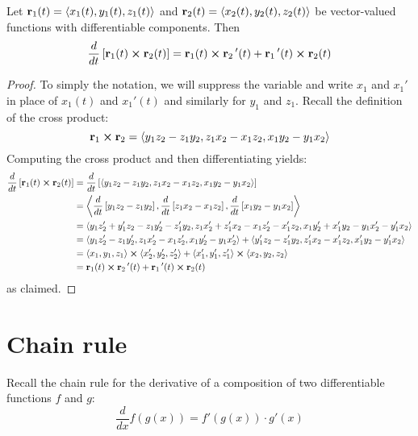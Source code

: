 \documentclass[handout]{ximera}
\begin{document}
\begin{proposition}
Let $\mathbf r_1(t) = \left\langle x_1(t), y_1(t),z_1(t)\right\rangle$ and $\mathbf r_2(t) = \left\langle x_2(t), y_2(t),z_2(t)\right\rangle$ be vector-valued functions with differentiable components.
Then
\[
\frac{d}{dt}\left[\mathbf r_1(t) \boldsymbol\times \mathbf r_2(t)\right] = \mathbf r_1(t) \boldsymbol\times \mathbf r_2\,'(t) + \mathbf r_1\,'(t) \boldsymbol\times \mathbf r_2(t)
\]
\end{proposition}
\begin{proof}
To simply the notation, we will suppress the variable and write $x_1$ and $x_1'$ in place of $x_1(t)$ and $x_1'(t)$ and similarly for $y_1$ and $z_1$.
Recall the definition of the cross product:
\[
\mathbf{r}_1 \boldsymbol\times \mathbf{r}_2 =  \left\langle y_1z_2 - z_1y_2, z_1x_2 - x_1z_2, x_1y_2 - y_1x_2\right\rangle
\]
Computing the cross product and then differentiating yields:
\begin{align*}
\frac{d}{dt}\left[\mathbf r_1(t) \boldsymbol\times \mathbf r_2(t)\right] &= \frac{d}{dt} \left[ \left\langle y_1z_2 - z_1y_2, z_1x_2 - x_1z_2, x_1y_2 - y_1x_2\right\rangle\right]\\
&=  \left\langle \frac{d}{dt} \left[y_1z_2 - z_1y_2\right], \frac{d}{dt} \left[z_1x_2 - x_1z_2\right],\frac{d}{dt} \left[x_1y_2 - y_1x_2\right]\right\rangle\\
&= \left\langle y_1z_2' + y_1'z_2- z_1y_2'  - z_1'y_2,  z_1x_2' + z_1'x_2- x_1z_2'  - x_1'z_2, x_1y_2' +x_1'y_2- y_1x_2'  - y_1'x_2      \right\rangle\\
&=\left\langle y_1z_2' - z_1y_2'  ,  z_1x_2' - x_1z_2', x_1y_2' - y_1x_2'\right\rangle+ \left\langle  y_1'z_2  - z_1'y_2, z_1'x_2 - x_1'z_2, x_1'y_2 - y_1'x_2\right\rangle\\
&= \left\langle x_1, y_1, z_1\right\rangle\boldsymbol\times \left\langle x_2', y_2', z_2'\right\rangle + \left\langle x_1', y_1', z_1'\right\rangle\boldsymbol\times \left\langle x_2, y_2, z_2\right\rangle\\
&= \mathbf r_1(t) \boldsymbol\times \mathbf r_2\,'(t) + \mathbf r_1\,'(t) \boldsymbol\times \mathbf r_2(t)
\end{align*}
as claimed.


\end{proof}

\section{Chain rule}
Recall the chain rule for the derivative of a composition of two differentiable functions $f$ and $g$:
\[
\frac{d}{dx} f(g(x)) = f'(g(x)) \cdot g'(x)
\]
\end{document}
